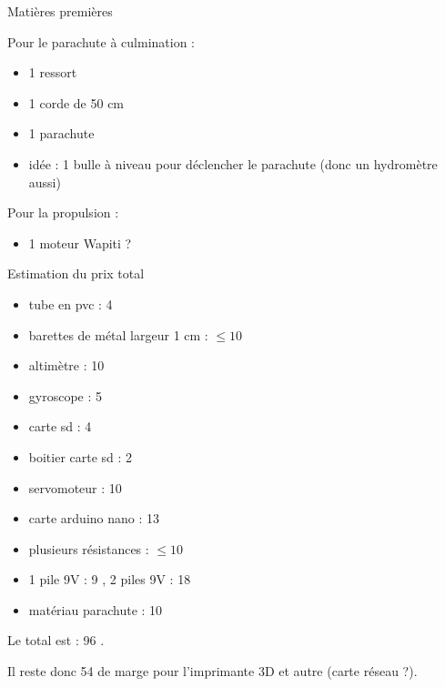 \documentclass{beamer}
\begin{document}
	\begin{frame}{Matières premières}

		\fontsize{6}{12}\selectfont
		

                Pour le parachute à culmination :
                \begin{itemize}

                        \item 1 ressort
                        \item 1 corde de 50 cm
                        \item 1 parachute
                        \item idée : 1 bulle à niveau pour déclencher le parachute (donc un hydromètre aussi)
                \end{itemize}



                Pour la propulsion :

                \begin{itemize}

                        \item 1 moteur Wapiti ?
                \end{itemize}

	\end{frame}
	
	
	\begin{frame}{Estimation du prix total}
		
		\fontsize{6}{12}\selectfont

		\begin{itemize}

			\item tube en pvc : 4 \texteuro{}
			\item barettes de métal largeur 1 cm : $\leq 10$ \texteuro{}
			\item altimètre : 10 \texteuro{}
			\item gyroscope : 5 \texteuro{}
			\item carte sd : 4 \texteuro{}
			\item boitier carte sd : 2 \texteuro{}
			\item servomoteur : 10 \texteuro{}
			\item carte arduino nano : 13 \texteuro{}
			\item plusieurs résistances : $\leq 10$ \texteuro{}
			\item 1 pile 9V : 9 \texteuro{}, 2 piles 9V : 18 \texteuro{}
			\item matériau parachute : 10 \texteuro{}
		\end{itemize}


		Le total est : 96 \texteuro{}.


		Il reste donc 54 \texteuro{} de marge pour l'imprimante 3D et autre (carte réseau ?).
	\end{frame}
	

	\begin{frame}

		
	
		
	\end{frame}
\end{document}
